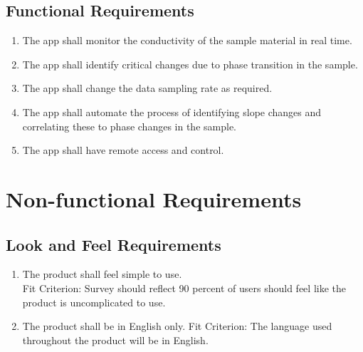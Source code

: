 \documentclass[12pt, titlepage]{article}
\begin{document}
\subsection{Functional Requirements}
\begin{enumerate}[{FR}1.] 
    \item
    The app shall monitor the conductivity of the sample material in real time. 
    \item
    The app shall identify critical changes due to phase transition in the sample.
    \item
    The app shall change the data sampling rate as required.
    \item
    The app shall automate the process of identifying slope changes and correlating these to phase changes in the sample. 
    \item
    The app shall have remote access and control. \\
	
\end{enumerate}

\section{Non-functional Requirements}


\subsection{Look and Feel Requirements}
\begin{adjustwidth}{2.2em}{0pt}
\begin{enumerate}[{NFR-L}1.]
   \item The product shall feel simple to use.\\
   Fit Criterion: Survey should reflect 90 percent of users should feel like the product is uncomplicated to use.
   \item The product shall be in English only.
   Fit Criterion: The language used throughout the product will be in English.
\end{enumerate}
\end{adjustwidth}
 
\end{document}
